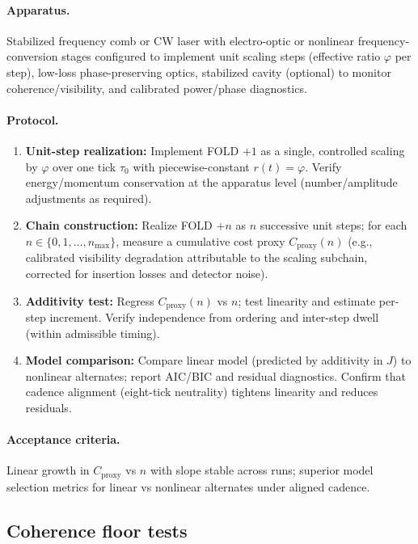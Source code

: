 \documentclass[12pt,a4paper]{article}
\begin{document}
\paragraph{Apparatus.}
Stabilized frequency comb or CW laser with electro-optic or nonlinear frequency-conversion stages configured to implement unit scaling steps (effective ratio $\varphi$ per step), low-loss phase-preserving optics, stabilized cavity (optional) to monitor coherence/visibility, and calibrated power/phase diagnostics.

\paragraph{Protocol.}
\begin{enumerate}
  \item \textbf{Unit-step realization:} Implement FOLD $+1$ as a single, controlled scaling by $\varphi$ over one tick $\tau_{0}$ with piecewise-constant $r(t)=\varphi$. Verify energy/momentum conservation at the apparatus level (number/amplitude adjustments as required).
  \item \textbf{Chain construction:} Realize FOLD $+n$ as $n$ successive unit steps; for each $n\in\{0,1,\dots,n_{\max}\}$, measure a cumulative cost proxy $C_{\mathrm{proxy}}(n)$ (e.g., calibrated visibility degradation attributable to the scaling subchain, corrected for insertion losses and detector noise).
  \item \textbf{Additivity test:} Regress $C_{\mathrm{proxy}}(n)$ vs $n$; test linearity and estimate per-step increment. Verify independence from ordering and inter-step dwell (within admissible timing).
  \item \textbf{Model comparison:} Compare linear model (predicted by additivity in $J$) to nonlinear alternates; report AIC/BIC and residual diagnostics. Confirm that cadence alignment (eight-tick neutrality) tightens linearity and reduces residuals.
\end{enumerate}

\paragraph{Acceptance criteria.}
Linear growth in $C_{\mathrm{proxy}}$ vs $n$ with slope stable across runs; superior model selection metrics for linear vs nonlinear alternates under aligned cadence.

\subsection{Coherence floor tests}
\end{document}
